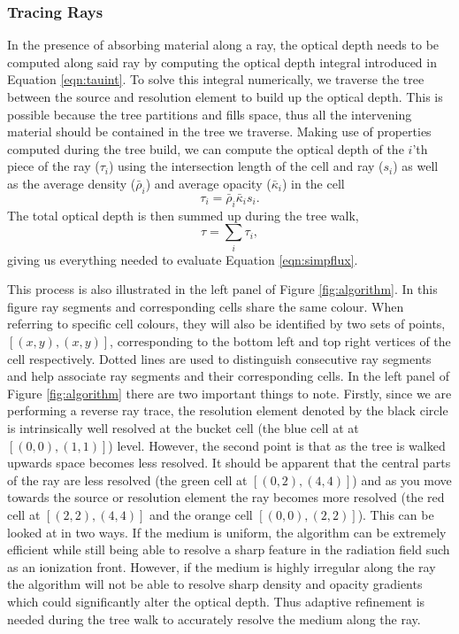 \documentclass[fleq,usenatbib]{mnras}
\begin{document}
\subsubsection{Tracing Rays}
In the presence of absorbing material along a ray, the optical depth needs to 
be computed along said ray by computing the optical depth integral introduced 
in Equation \ref{eqn:tauint}. To solve this integral numerically, we traverse 
the tree between the source and resolution element to build up the optical 
depth. This is possible because the tree partitions and fills space, thus all 
the intervening material should be contained in the tree we traverse. Making 
use of properties computed during the tree build, we can compute the optical 
depth of the $i$'th piece of the ray ($\tau_i$) using the intersection length 
of the cell and ray ($s_i$) as well as the average density ($\bar{\rho}_i$) 
and average opacity ($\bar{\kappa}_i$) in the cell
\begin{equation}
\label{eqn:taui}
\tau_i = \bar{\rho}_i \bar{\kappa}_i s_i.
\end{equation}
The total optical depth is then summed up during the tree walk,
\begin{equation}
\label{eqn:tausum}
\tau = \sum_i \tau_i,
\end{equation}
giving us everything needed to evaluate Equation \ref{eqn:simpflux}. 

This process is also illustrated in the left panel of Figure 
\ref{fig:algorithm}. In this figure ray segments and corresponding cells share 
the same colour. When referring to specific cell colours, they will also be 
identified by two sets of points, $[(x,y),(x,y)]$, corresponding to the bottom 
left and top right vertices of the cell respectively. Dotted lines are used to 
distinguish consecutive ray segments and help associate ray segments and their 
corresponding cells. In the left panel of Figure \ref{fig:algorithm} there are 
two important things to note. Firstly, since we are performing a reverse ray 
trace, the resolution element denoted by the black circle is intrinsically 
well resolved at the bucket cell (the blue cell at at $[(0,0),(1,1)]$) level. 
However, the second point is that as the tree is walked upwards space becomes 
less resolved. It should be apparent that the central parts of the ray are 
less resolved (the green cell at $[(0,2),(4,4)]$) and as you move towards the 
source or resolution element the ray becomes more resolved (the red cell at 
$[(2,2),(4,4)]$ and the orange cell $[(0,0),(2,2)]$). This can be looked at in 
two ways. If the medium is uniform, the algorithm can be extremely efficient 
while still being able to resolve a sharp feature in the radiation field such 
as an ionization front. However, if the medium is highly irregular along the 
ray the algorithm will not be able to resolve sharp density and opacity 
gradients which could significantly alter the optical depth. Thus adaptive 
refinement is needed during the tree walk to accurately resolve the medium 
along the ray.
\end{document}
